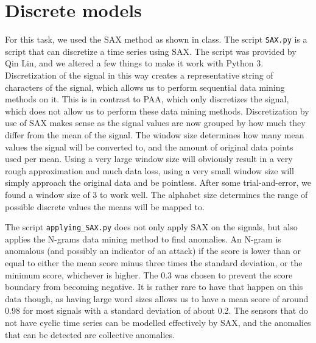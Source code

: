 \documentclass[]{article}
\begin{document}
\section{Discrete models}
For this task, we used the SAX method as shown in class. The script \texttt{SAX.py} is a script that can discretize a time series using SAX. The script was provided by Qin Lin, and we altered a few things to make it work with Python 3. Discretization of the signal in this way creates a representative string of characters of the signal, which allows us to perform sequential data mining methods on it. This is in contrast to PAA, which only discretizes the signal, which does not allow us to perform these data mining methods. Discretization by use of SAX makes sense as the signal values are now grouped by how much they differ from the mean of the signal. The window size determines how many mean values the signal will be converted to, and the amount of original data points used per mean. Using a very large window size will obviously result in a very rough approximation and much data loss, using a very small window size will simply approach the original data and be pointless. After some trial-and-error, we found a window size of 3 to work well. The alphabet size determines the range of possible discrete values the means will be mapped to. 

The script \texttt{applying\_SAX.py} does not only apply SAX on the signals, but also applies the N-grams data mining method to find anomalies. An N-gram is anomalous (and possibly an indicator of an attack) if the score is lower than or equal to either the mean score minus three times the standard deviation, or the minimum score, whichever is higher. The 0.3 was chosen to prevent the score boundary from becoming negative. It is rather rare to have that happen on this data though, as having large word sizes allows us to have a mean score of around 0.98 for most signals with a standard deviation of about 0.2. The sensors that do not have cyclic time series can be modelled effectively by SAX, and the anomalies that can be detected are collective anomalies.
\clearpage
\end{document}
